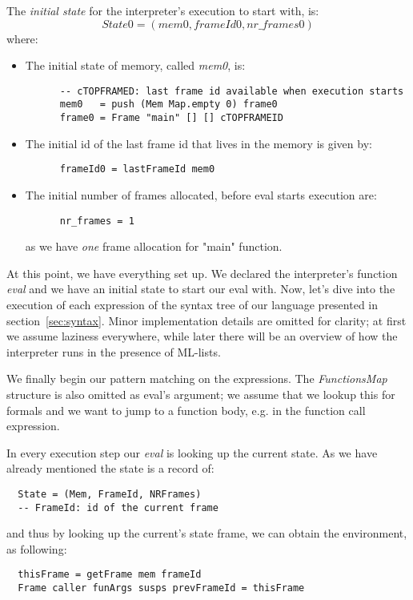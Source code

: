 \documentclass[diploma]{softlab-thesis}
\begin{document}
The \textit{initial state} for the interpreter's execution to start with, is:
\[ 
  \mathit{State0 = (mem0, frameId0, nr\_frames0) }
\]
where:
\begin{itemize}
  \item The initial state of memory, called \textit{mem0}, is:
    \begin{verbatim}
      -- cTOPFRAMED: last frame id available when execution starts
      mem0   = push (Mem Map.empty 0) frame0 
      frame0 = Frame "main" [] [] cTOPFRAMEID 
    \end{verbatim}
  \item The initial id of the last frame id that lives in the memory is given by:
    \begin{verbatim}
      frameId0 = lastFrameId mem0
    \end{verbatim}
  \item The initial number of frames allocated, before eval starts execution are:
    \begin{verbatim}
      nr_frames = 1
    \end{verbatim}
  as we have \textit{one} frame allocation for "main" function.
\end{itemize}

At this point, we have everything set up. We declared the interpreter's function \textit{eval} and we have an initial 
state to start our eval with. Now, let's dive into the execution of each expression of the syntax tree of our language 
presented in section~\ref{sec:syntax}. Minor implementation details are omitted for clarity; at first we assume laziness everywhere, 
while later there will be an overview of how the interpreter runs in the presence of ML-lists.

We finally begin our pattern matching on the expressions. The \textit{FunctionsMap} structure is also omitted as 
eval's argument; we assume that we lookup this for formals and we want to jump to a function body, e.g. in the function  
call expression.

In every execution step our \textit{eval} is looking up the current state. As we have already mentioned the state is 
a record of:
\begin{verbatim}
  State = (Mem, FrameId, NRFrames) 
  -- FrameId: id of the current frame
\end{verbatim}
and thus by looking up the current's state frame, we can obtain the environment, as following:
\begin{verbatim}
  thisFrame = getFrame mem frameId 
  Frame caller funArgs susps prevFrameId = thisFrame 
\end{verbatim}
\end{document}
